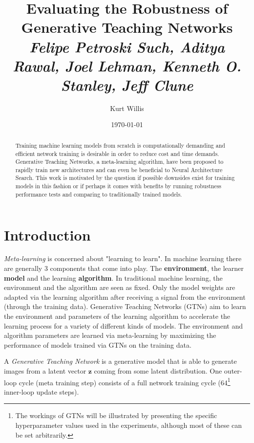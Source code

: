 \documentclass[10pt]{article}
\title{
Evaluating the Robustness of \\
Generative Teaching Networks \\[5pt]
\large{\textit{Felipe Petroski Such, Aditya Rawal, Joel Lehman, Kenneth O. Stanley, Jeff Clune}}}
\author{Kurt Willis}
\date{\today}
\renewcommand\vec[1]{\boldsymbol{\mathbf {#1}}}
\begin{document}
\maketitle

\begin{abstract}
    Training machine learning models from scratch is 
    computationally demanding 
    and efficient network training is desirable in order 
    to reduce cost and time demands.
    Generative Teaching Networks, a meta-learning algorithm, 
    have been proposed to rapidly train new architectures
    and can even be beneficial to Neural Architecture Search.
    This work is motivated by the question if possible downsides
    exist for training models in this fashion or if perhaps
    it comes with benefits by running robustness performance
    tests and comparing to traditionally trained models.
\end{abstract}

\section{Introduction}
\textit{Meta-learning} is concerned about "learning to learn". 
In machine learning there are generally 3 components that come into play.
The \textbf{environment}, the learner \textbf{model} and the learning \textbf{algorithm}.
In traditional machine learning, the environment and the algorithm are seen as fixed.
Only the model weights are adapted via the learning algorithm 
after receiving a signal from the environment (through the training data).
Generative Teaching Networks (GTNs) \citep{such2019generative} aim to learn the environment
and parameters of the learning algorithm to accelerate the learning process
for a variety of different kinds of models.
The environment and algorithm parameters are learned 
via meta-learning by maximizing the performance
of models trained via GTNs on the training data.



A \textit{Generative Teaching Network} is a generative model
that is able to generate images from a latent vector $\vec z$
coming from some latent distribution. 
One outer-loop cycle (meta training step) 
consists of a full network training cycle
(64\footnote{The workings of GTNs will be illustrated by presenting the specific hyperparameter values used in the experiments, although most of these can be set arbitrarily.} inner-loop update steps).
\end{document}
